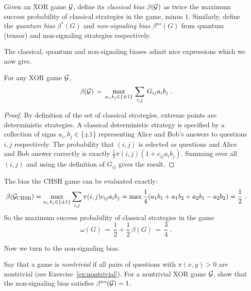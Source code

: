 \begin{definition}
Given an XOR game $\mathcal{G}$, define its \emph{classical bias} $\beta(\mathcal{G})$ as twice the maximum success probability of classical strategies in the game, minus $1$. Similarly, define the \emph{quantum bias} $\beta^*(G)$ and \emph{non-signaling bias} $\beta^{ns}(G)$ from quantum (tensor) and non-signaling strategies respectively.
\end{definition}

The classical, quantum and non-signaling biases admit nice expressions which we now give. 

\begin{lemma}
For any XOR game $\mathcal{G}$, 
 \begin{equation}\label{eq:bias-class}
 \beta(\mathcal{G}) \,=\, \max_{a_i,b_j\in\{\pm 1\}}\,\sum_{i,j}\, G_{ij}a_ib_j \;.
 \end{equation}
\end{lemma}

\begin{proof}
By definition of the set of classical strategies, extreme points are deterministic strategies. A classical deterministic strategy is specified by a collection of signs $a_i,b_j\in\{\pm 1\}$ representing Alice and Bob's answers to questions $i,j$ respectively. The probability that $(i,j)$ is selected as questions and Alice and Bob answer correctly is exactly $\frac{1}{2}\pi(i,j)(1+c_{ij}a_ib_j)$. Summing over all $(i,j)$ and using the definition of $G_{ij}$ gives the result. 
\end{proof}

\begin{example}\label{ex:chsh-beta}
The bias the CHSH game can be evaluated exactly: 
 $$ \beta(\mathcal{G}_{\textsc{CHSH}})=\max_{a_i,b_j\in\{\pm 1\}}\sum_{i,j}\pi(i,j)c_{ij}a_ib_j=\max\frac{1}{4}(a_1b_1+a_1b_2+a_2b_1-a_2b_2)= \frac{1}{2}\;.  $$
	So the maximum success probability of classical strategies in the game  
	$$\omega(G) \,=\, \frac{1}{2} + \frac{1}{2}\, \beta(G) \,=\, \frac{3}{4}\;.$$
\end{example}

Now we turn to the non-signaling bias. 

\begin{exercise}
Say that a game is \emph{nontrivial} if all pairs of questions with $\pi(x,y)>0$ are nontrivial (see Exercise~\ref{ex:nontrivial}). For a nontrivial XOR game $\mathcal{G}$, show that the non-signaling bias satisfies $\beta^{ns}(\mathcal{G})=1$.
\end{exercise}

